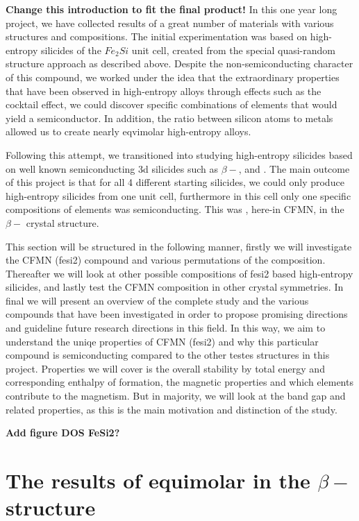 \textbf{Change this introduction to fit the final product!}
In this one year long project, we have collected results of a great number of materials with various structures and compositions. The initial experimentation was based on high-entropy silicides of the $Fe_2Si$ unit cell, created from the special quasi-random structure approach as described above. Despite the non-semiconducting character of this compound, we worked under the idea that the extraordinary properties that have been observed in high-entropy alloys through effects such as the cocktail effect, we could discover specific combinations of elements that would yield a semiconductor. In addition, the ratio between silicon atoms to metals allowed us to create nearly eqvimolar high-entropy alloys. 

Following this attempt, we transitioned into studying high-entropy silicides based on well known semiconducting 3d silicides such as $\beta-$,  and . The main outcome of this project is that for all 4 different starting silicides, we could only produce high-entropy silicides from one unit cell, furthermore in this cell only one specific compositions of elements was semiconducting. This was , here-in CFMN, in the $\beta-$  crystal structure.  

This section will be structured in the following manner, firstly we will investigate the CFMN (fesi2) compound and various permutations of the composition. Thereafter we will look at other possible compositions of fesi2 based high-entropy silicides, and lastly test the CFMN composition in other crystal symmetries. In final we will present an overview of the complete study and the various compounds that have been investigated in order to propose promising directions and guideline future research directions in this field. In this way, we aim to understand the uniqe properties of CFMN (fesi2) and why this particular compound is semiconducting compared to the other testes structures in this project. Properties we will cover is the overall stability by total energy and corresponding enthalpy of formation, the magnetic properties and which elements contribute to the magnetism. But in majority, we will look at the band gap and related properties, as this is the main motivation and distinction of the study.

\textbf{Add figure DOS FeSi2?}


\chapter{The results of equimolar  in the $\beta-$ structure}
\label{sec:equi}

